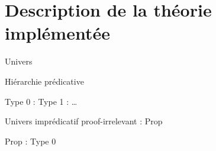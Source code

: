 \documentclass[12pt, aspectratio=169]{beamer}
\begin{document}
    \section{Description de la théorie implémentée}

        \begin{frame}[fragile]{Univers}

            \begin{block}{Hiérarchie prédicative}

                Type 0 : Type 1 : \dots

                \begin{center}
                    \begin{prooftree}
                    \end{prooftree}
                \end{center}

            \end{block}

            \pause

            \begin{block}{Univers imprédicatif proof-irrelevant : Prop}

                Prop : Type 0

                \begin{center}
                    \begin{prooftree}
                    \end{prooftree}
                \end{center}

            \end{block}

        \end{frame}
\end{document}
